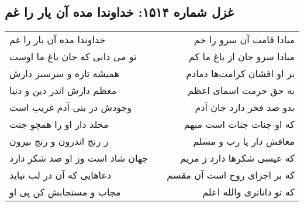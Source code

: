 \begin{center}
\section*{غزل شماره ۱۵۱۴: خداوندا مده آن یار را غم}
\label{sec:1514}
\begin{longtable}{l p{0.5cm} r}
خداوندا مده آن یار را غم
&&
مبادا قامت آن سرو را خم
\\
تو می دانی که جان باغ ما اوست
&&
مبادا سرو جان از باغ ما کم
\\
همیشه تازه و سرسبز دارش
&&
بر او افشان کرامت‌ها دمادم
\\
معظم دارش اندر دین و دنیا
&&
به حق حرمت اسمای اعظم
\\
وجودش در بنی آدم غریب است
&&
بدو صد فخر دارد جان آدم
\\
مخلد دار او را همچو جنت
&&
که او جنات جنات است مبهم
\\
ز رنج اندرون و رنج بیرون
&&
معافش دار یا رب و مسلم
\\
جهان شاد است وز او صد شکر دارد
&&
که عیسی شکرها دارد ز مریم
\\
دعاهایی که آن در لب نیاید
&&
که بر اجزای روح است آن مقسم
\\
مجاب و مستجابش کن پی او
&&
که تو داناتری والله اعلم
\\
\end{longtable}
\end{center}
